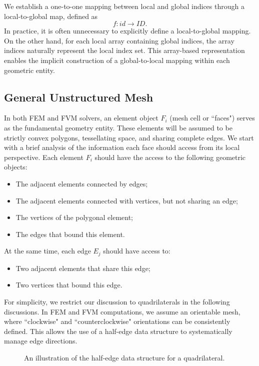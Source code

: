 We establish a one-to-one mapping between local and global indices through
a local-to-global map, defined as 
\begin{equation}
		  f: id \rightarrow ID.
\end{equation}
In practice, it is often unnecessary to explicitly define a local-to-global
mapping.
On the other hand, for each local array containing global indices, the array indices
naturally represent the local index set.
This array-based representation enables the implicit construction of a global-to-local
mapping within each geometric entity.

\subsection{General Unstructured Mesh}
In both FEM and FVM solvers, an element object $F_i$ (mesh cell or ``faces") 
serves as the fundamental geometry entity.
These elements will be assumed to be strictly convex polygons,
tessellating space, and sharing complete edges.
We start with a brief analysis of the information each face
should access from its local perspective.
Each element $F_i$ should have the access to the following geometric
objects:
\begin{itemize}
		  \item The adjacent elements connected by edges;
		  \item The adjacent elements connected with vertices, 
					 but not sharing an edge;
		  \item The vertices of the polygonal element;
		  \item The edges that bound this element.
\end{itemize}
At the same time, each edge $E_j$ should have access to:
\begin{itemize}
		  \item Two adjacent elements that share this edge;
		  \item Two vertices that bound this edge.
\end{itemize}

For simplicity, we restrict our discussion to quadrilaterals in
the following discussions.
In FEM and FVM computations, we assume an orientable mesh, where 
``clockwise" and ``counterclockwise" orientations can be consistently defined.
This allows the use of a half-edge data structure to systematically manage edge directions.
\begin{figure}[ht]
\centering

		  \caption{An illustration of the half-edge data structure for a quadrilateral.}
		  \label{fig:halfedge}
\end{figure}

